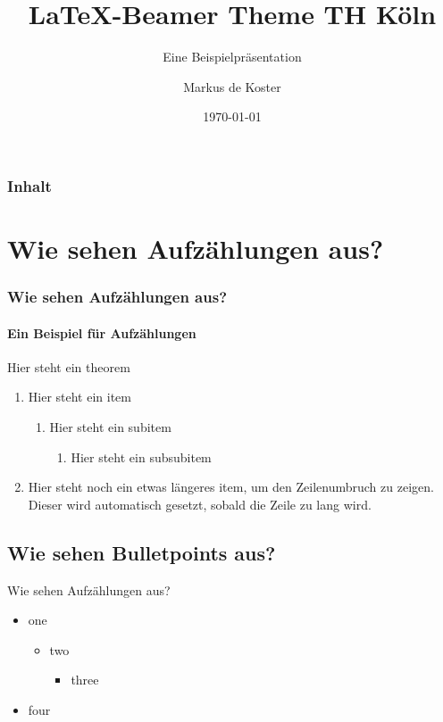 \documentclass{beamer}
\title{\LaTeX -Beamer Theme TH Köln}
\subtitle[Beispielpräsi]{Eine Beispielpräsentation}
\institute[TH Köln]{Technische Hochschule Köln}
\date[\ddmmyyyydate\today]{\today} %
\author[de Koster]{Markus de Koster}
\begin{document}
\begin{frame}
\titlepage
\end{frame}

\begin{frame}
    \frametitle{Inhalt}
    \tableofcontents
\end{frame}

\section{Wie sehen Aufzählungen aus?}\label{sec:enumerations}
\begin{frame} 
\frametitle{Wie sehen Aufzählungen aus?} 
\framesubtitle{Ein Beispiel für Aufzählungen} 
\begin{theorem}
    Hier steht ein theorem
\end{theorem} 
\begin{enumerate} 
    \item Hier steht ein item 
    \begin{enumerate} 
        \item Hier steht ein subitem
        \begin{enumerate} 
            \item Hier steht ein subsubitem
        \end{enumerate}
    \end{enumerate}
    \item Hier steht noch ein etwas längeres item, um den Zeilenumbruch zu zeigen. 
    Dieser wird automatisch gesetzt, sobald die Zeile zu lang wird.
\end{enumerate}
\end{frame}

\subsection{Wie sehen Bulletpoints aus?}\label{sec:itemize}
\begin{frame}{Wie sehen Aufzählungen aus?}
\begin{itemize}
\item one
\begin{itemize}
    \item two
    \begin{itemize}
        \item three
    \end{itemize}    
\end{itemize}    
\item four
\end{itemize}
\end{frame}
\end{document}
